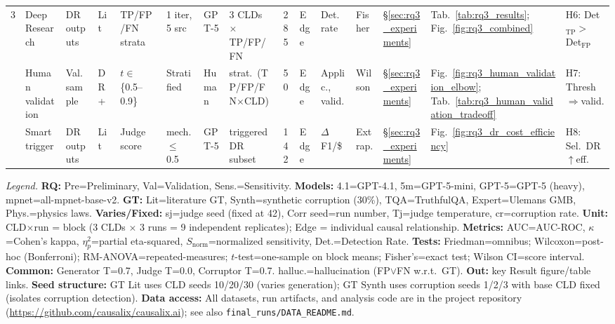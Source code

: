 \begin{landscape}
\begin{table}[H]
{\begin{tabular}{@{}l l l l l l l l c l l l l l l@{}}
\midrule
\multirow{3}{*}{3}
  & Deep Research & DR outputs & Lit & TP/FP/FN strata & 1 iter, 5 src & GPT-5 & 3 CLDs $\times$ TP/FP/FN & 285 & Edge & Det.\ rate & Fisher & \S\ref{sec:rq3_experiments} & Tab.~\ref{tab:rq3_results}; Fig.~\ref{fig:rq3_combined} & H6: Det$_{\text{TP}}$$>$Det$_{\text{FP}}$ \\
  & Human validation & Val.\ sample & DR+ & $t\in$\{0.5--0.9\} & Stratified & Human & strat.\ (TP/FP/FN$\times$CLD) & 50 & Edge & Applic., valid. & Wilson & \S\ref{sec:rq3_experiments} & Fig.~\ref{fig:rq3_human_validation_elbow}; Tab.~\ref{tab:rq3_human_validation_tradeoff} & H7: Thresh$\Rightarrow$valid. \\
  & Smart trigger & DR outputs & Lit & Judge score & mech. $\leq$ 0.5 & GPT-5 & triggered DR subset & 142 & Edge & $\Delta$F1/\$ & Extrap. & \S\ref{sec:rq3_experiments} & Fig.~\ref{fig:rq3_dr_cost_efficiency} & H8: Sel.\ DR$\uparrow$eff. \\
\bottomrule
\end{tabular}}%

\vspace{0.3em}
\begin{minipage}{\linewidth}
\scriptsize
\textit{Legend.} 
\textbf{RQ:} Pre=Preliminary, Val=Validation, Sens.=Sensitivity.
\textbf{Models:} 4.1=GPT-4.1, 5m=GPT-5-mini, GPT-5=GPT-5 (heavy), mpnet=all-mpnet-base-v2.
\textbf{GT:} Lit=literature GT, Synth=synthetic corruption (30\%), TQA=TruthfulQA, Expert=Ulemans GMB, Phys.=physics laws.
\textbf{Varies/Fixed:} sj=judge seed (fixed at 42), Corr seed=run number, Tj=judge temperature, cr=corruption rate.
\textbf{Unit:} CLD$\times$run = block (3 CLDs $\times$ 3 runs = 9 independent replicates); Edge = individual causal relationship.
\textbf{Metrics:} AUC=AUC-ROC, $\kappa$=Cohen's kappa, $\eta^2_p$=partial eta-squared, $S_{\text{norm}}$=normalized sensitivity, Det.=Detection Rate.
\textbf{Tests:} Friedman=omnibus; Wilcoxon=post-hoc (Bonferroni); RM-ANOVA=repeated-measures; $t$-test=one-sample on block means; Fisher's=exact test; Wilson CI=score interval.
\textbf{Common:} Generator T=0.7, Judge T=0.0, Corruptor T=0.7. halluc.=hallucination (FP$\lor$FN w.r.t.\ GT). \textbf{Out:} key Result figure/table links.
\textbf{Seed structure:} GT Lit uses CLD seeds 10/20/30 (varies generation); GT Synth uses corruption seeds 1/2/3 with base CLD fixed (isolates corruption detection).
\textbf{Data access:} All datasets, run artifacts, and analysis code are in the project repository (\url{https://github.com/causalix/causalix.ai}); see also \texttt{final\_runs/DATA\_README.md}.
\end{minipage}
\end{table}
\end{landscape}

